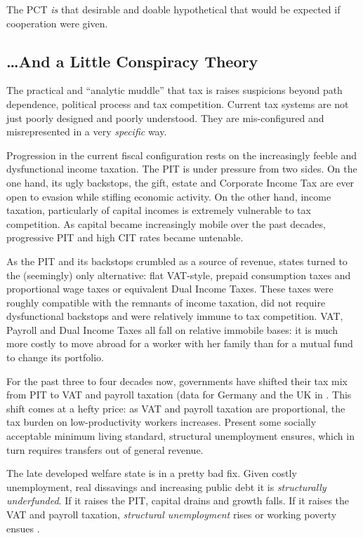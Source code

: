 The PCT \emph{is} that desirable and doable hypothetical that would be expected if cooperation were given.

\subsection[Conspiracy Theory]{\ldots And a Little Conspiracy Theory}
	\label{sec:Conspiracy}
The practical and ``analytic muddle'' that tax is \citep[862]{McCaffery2005} raises suspicions beyond path dependence, political process and tax competition.
Current tax systems are not just poorly designed and poorly understood.
They are mis-configured and misrepresented in a very \emph{specific} way.

Progression in the current fiscal configuration rests on the increasingly feeble and dysfunctional income taxation.
The PIT is under pressure from two sides.
On the one hand, its ugly backstops, the gift, estate and Corporate Income Tax are ever open to evasion while stifling economic activity.
On the other hand, income taxation, particularly of capital incomes is extremely vulnerable to tax competition.
As capital became increasingly mobile over the past decades, progressive PIT and high CIT rates became untenable.

As the PIT and its backstops crumbled as a source of revenue, states turned to the (seemingly) only alternative:
flat VAT-style, prepaid consumption taxes and proportional wage taxes or equivalent Dual Income Taxes.
These taxes were roughly compatible with the remnants of income taxation, did not require dysfunctional backstops and were relatively immune to tax competition.
VAT, Payroll and Dual Income Taxes all fall on relative immobile bases:
it is much more costly to move abroad for a worker with her family than for a mutual fund to change its portfolio.

For the past three to four decades now, governments have shifted their tax mix from PIT to VAT and payroll taxation (data for Germany and the UK in \citealt[11]{Kemmerling2009}.
This shift comes at a hefty price:
as VAT and payroll taxation are proportional, the tax burden on low-productivity workers increases.
Present some socially acceptable minimum living standard, structural unemployment ensures, which in turn requires transfers out of general revenue.

The late developed welfare state is in a pretty bad fix.
Given costly unemployment, real dissavings and increasing public debt it is \emph{structurally underfunded}.
If it raises the PIT, capital drains and growth falls.
If it raises the VAT and payroll taxation, \emph{structural unemployment} rises or working poverty ensues \citep{Kato2003}.

